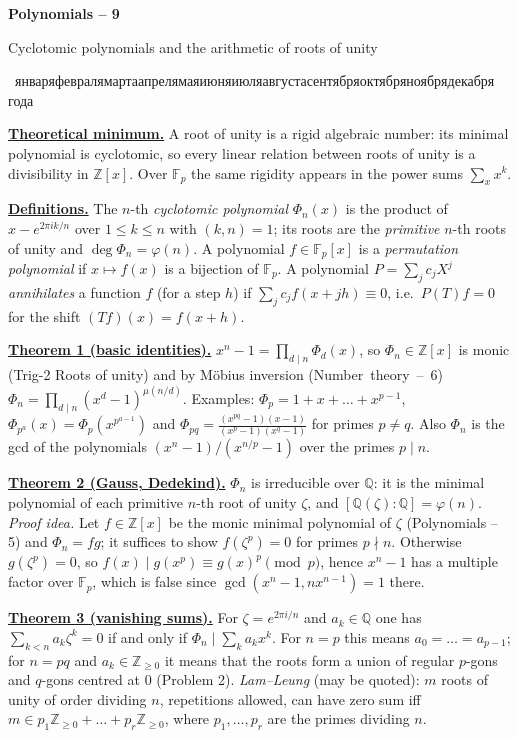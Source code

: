 \documentclass[11pt,a4paper]{article}
\newcommand{\head}[1]{\par\medskip\noindent\textbf{\underline{#1}}\quad}
\newcommand{\sheettitle}[3]{%
  \begin{center}
  {\huge\bfseries #1\par}\vspace{1.2em}
  {\Large #2\par}\vspace{0.8em}
  \if\relax\detokenize{#3}\relax\else{\Large #3\par}\vspace{0.8em}\fi
  {\foreignlanguage{russian}{\rudate}\par}
  \end{center}\vspace{0.5em}}
\newcommand{\rudate}{\number\day~\ifcase\month\or января\or февраля\or марта\or апреля\or мая\or июня\or июля\or августа\or сентября\or октября\or ноября\or декабря\fi~\number\year~года}
\begin{document}
\sheettitle{Polynomials -- 9}{Cyclotomic polynomials and the arithmetic of roots of unity}{}

\head{Theoretical minimum.} A root of unity is a rigid algebraic number: its minimal polynomial
is cyclotomic, so every linear relation between roots of unity is a divisibility in
$\mathbb{Z}[x]$. Over $\mathbb{F}_p$ the same rigidity appears in the power sums $\sum_x x^k$.

\head{Definitions.} The $n$-th \emph{cyclotomic polynomial} $\Phi_n(x)$ is the product of
$x-e^{2\pi ik/n}$ over $1\le k\le n$ with $(k,n)=1$; its roots are the
\emph{primitive} $n$-th roots of unity and $\deg\Phi_n=\varphi(n)$. A polynomial
$f\in\mathbb{F}_p[x]$ is a \emph{permutation polynomial} if $x\mapsto f(x)$ is a bijection of
$\mathbb{F}_p$. A polynomial $P=\sum_j c_jX^j$ \emph{annihilates} a function $f$ (for a step
$h$) if $\sum_j c_jf(x+jh)\equiv0$, i.e.\ $P(T)f=0$ for the shift $(Tf)(x)=f(x+h)$.

\head{Theorem 1 (basic identities).} $x^n-1=\prod_{d\mid n}\Phi_d(x)$, so $\Phi_n\in\mathbb{Z}[x]$
is monic (Trig-2 Roots of unity) and by M\"obius inversion (Number~theory~--~6)
$\Phi_n=\prod_{d\mid n}(x^d-1)^{\mu(n/d)}$. Examples: $\Phi_p=1+x+\dots+x^{p-1}$,
$\Phi_{p^a}(x)=\Phi_p(x^{p^{a-1}})$ and
$\Phi_{pq}=\frac{(x^{pq}-1)(x-1)}{(x^p-1)(x^q-1)}$ for primes $p\neq q$. Also $\Phi_n$ is the gcd
of the polynomials $(x^n-1)/(x^{n/p}-1)$ over the primes $p\mid n$.

\head{Theorem 2 (Gauss, Dedekind).} $\Phi_n$ is irreducible over $\mathbb{Q}$: it is the
minimal polynomial of each primitive $n$-th root of unity $\zeta$, and
$[\mathbb{Q}(\zeta):\mathbb{Q}]=\varphi(n)$. \emph{Proof idea.} Let $f\in\mathbb{Z}[x]$ be the
monic minimal polynomial of $\zeta$ (Polynomials -- 5) and $\Phi_n=fg$; it suffices to show
$f(\zeta^p)=0$ for primes $p\nmid n$. Otherwise $g(\zeta^p)=0$, so $f(x)\mid g(x^p)\equiv
g(x)^p\pmod p$, hence $x^n-1$ has a multiple factor over $\mathbb{F}_p$, which is false since
$\gcd(x^n-1,nx^{n-1})=1$ there.

\head{Theorem 3 (vanishing sums).} For $\zeta=e^{2\pi i/n}$ and $a_k\in\mathbb{Q}$ one has
$\sum_{k<n}a_k\zeta^k=0$ if and only if $\Phi_n\mid\sum_k a_kx^k$. For $n=p$ this means
$a_0=\dots=a_{p-1}$; for $n=pq$ and $a_k\in\mathbb{Z}_{\ge0}$ it means that the roots form a
union of regular $p$-gons and $q$-gons centred at $0$ (Problem 2). \emph{Lam--Leung} (may be
quoted): $m$ roots of unity of order dividing $n$, repetitions allowed, can have zero sum iff
$m\in p_1\mathbb{Z}_{\ge0}+\dots+p_r\mathbb{Z}_{\ge0}$, where $p_1,\dots,p_r$ are the primes
dividing $n$.
\end{document}
